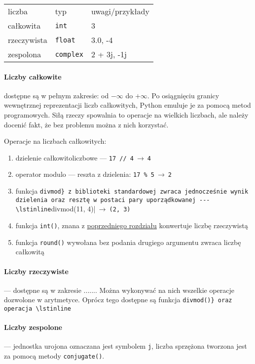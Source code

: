 \documentclass[a4paper]{article}
\begin{document}
\begin{tabular}{l | l | l}
  \textsf{liczba} & \textsf{typ}     & \textsf{uwagi/przykłady} \\
  całkowita       & \texttt{int}     & 3                        \\
  rzeczywista     & \texttt{float}   & 3.0, -4                  \\
  zespolona       & \texttt{complex} & 2 + 3j, -1j              \\
\end{tabular}

\paragraph{Liczby całkowite}dostępne są w pełnym zakresie: od $-\infty$ do $+\infty$. Po osiągnięciu granicy wewnętrznej reprezentacji liczb całkowitych, Python emuluje je za pomocą metod programowych. Siłą rzeczy spowalnia to operacje na wielkich liczbach, ale należy docenić fakt, że bez problemu można z nich korzystać.

Operacje na liczbach całkowitych:
\begin{enumerate}
  \item dzielenie całkowitoliczbowe --- \lstinline|17 // 4|$\ \to\ $\lstinline|4|
  \item operator modulo --- reszta z dzielenia: \lstinline|17 % 5|$\ \to\ $\lstinline|2|
  \item funkcja \lstinline|divmod} z biblioteki standardowej zwraca jednocześnie wynik dzielenia oraz resztę w postaci pary uporządkowanej --- \lstinline|divmod(11, 4)|$\ \to\ $\lstinline|(2, 3)|
  \item funkcja \lstinline|int()|, znana z \hyperref[int-oraz-float]{poprzedniego rozdziału} konwertuje liczbę rzeczywistą
  \item funkcja \lstinline|round()| wywołana bez podania drugiego argumentu zwraca liczbę całkowitą
\end{enumerate}

\paragraph{Liczby rzeczywiste}--- dostępne są w zakresie ....... Można wykonywać na nich wszelkie operacje dozwolone w arytmetyce. Oprócz tego dostępne są funkcja \lstinline|divmod()} oraz operacja \lstinline|%

\paragraph{Liczby zespolone} --- jednostka urojona oznaczana jest symbolem \texttt{j}, liczba sprzężona tworzona jest za pomocą metody \lstinline|conjugate()|.
\end{document}
